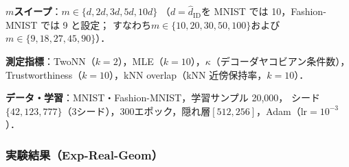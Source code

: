 \documentclass[11pt,a4paper]{jsarticle}
\newcommand{\kap}{\kappa}
\begin{document}
\textbf{$m$スイープ}：$m \in \{d, 2d, 3d, 5d, 10d\}$
（$d = \hat{d}_\mathrm{ID}$を MNIST では 10，Fashion-MNIST では 9 と設定；
すなわち$m \in \{10, 20, 30, 50, 100\}$および$m \in \{9, 18, 27, 45, 90\}$）．

\textbf{測定指標}：TwoNN（$k=2$），MLE（$k=10$），$\kap$（デコーダヤコビアン条件数），
Trustworthiness（$k=10$），kNN overlap（kNN 近傍保持率，$k=10$）．

\textbf{データ・学習}：MNIST・Fashion-MNIST，学習サンプル 20,000，
シード$\{42, 123, 777\}$（3シード），300エポック，隠れ層$[512, 256]$，Adam（lr$=10^{-3}$）．

\subsubsection*{実験結果（Exp-Real-Geom）}
\end{document}
